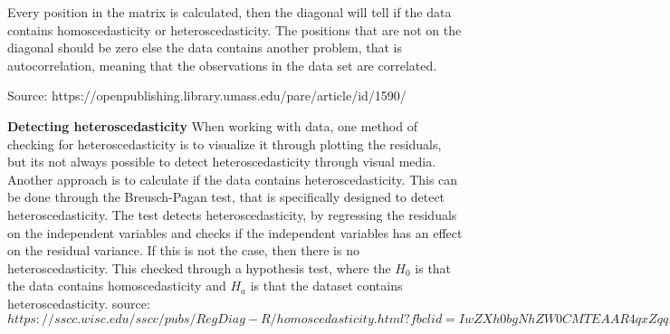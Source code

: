 	Every position in the matrix is calculated, then the diagonal will tell if the data contains homoscedasticity or heteroscedasticity. The positions that are not on the diagonal should be zero else the data contains another problem, that is autocorrelation, meaning that the observations in the data set are correlated.
	
	Source: https://openpublishing.library.umass.edu/pare/article/id/1590/
	
	\textbf{Detecting heteroscedasticity}
	When working with data, one method of checking for heteroscedasticity is to visualize it through plotting the residuals, but its not always possible to detect heteroscedasticity through visual media. Another approach is to calculate if the data contains heteroscedasticity. This can be done through the Breusch-Pagan test, that is specifically designed to detect heteroscedasticity. The test detects heteroscedasticity, by regressing the residuals on the independent variables and checks if the independent variables has an effect on the residual variance. If this is not the case, then there is no heteroscedasticity. This checked through a hypothesis test, where the $H_0$ is that the data contains homoscedasticity and $H_a$ is that the dataset contains heteroscedasticity.
	source: $https://sscc.wisc.edu/sscc/pubs/RegDiag-R/homoscedasticity.html?fbclid=IwZXh0bgNhZW0CMTEAAR4qxZqqD0CVoqZfHgWZU8lUOuxg43dFRSs9Opswn-IAo8l-UaO1oDWCuUfkvw_aem_9Ft7wkFWKUHycQ1GnX-x0g$
	
